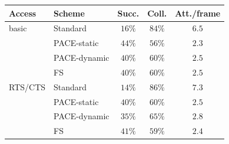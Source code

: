 \begin{tabular}{llccc}
\hline
\textbf{Access} & \textbf{Scheme} & \textbf{Succ.} & \textbf{Coll.} & \textbf{Att./frame} \\
\hline
basic   & Standard & $16\%$ & $84\%$ & $6.5$ \\
        & PACE-static& $44\%$ & $56\%$ & $2.3$ \\
        & PACE-dynamic& $40\%$ & $60\%$ & $2.5$ \\
        & FS       & $40\%$ & $60\%$ & $2.5$ \\
\hline
RTS/CTS & Standard & $14\%$ & $86\%$ & $7.3$ \\
        & PACE-static& $40\%$ & $60\%$ & $2.5$ \\
        & PACE-dynamic& $35\%$ & $65\%$ & $2.8$ \\
        & FS       & $41\%$ & $59\%$ & $2.4$ \\
\hline
\end{tabular}
